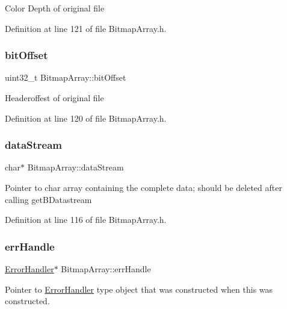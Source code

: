 Color Depth of original file 

Definition at line 121 of file Bitmap\+Array.\+h.

\mbox{\label{classBitmapArray_abcab200a1eb84331f7c79702e9199694}} 
\subsubsection{\texorpdfstring{bitOffset}{bitOffset}}
{\footnotesize\ttfamily uint32\+\_\+t Bitmap\+Array\+::bit\+Offset\hspace{0.3cm}{\ttfamily [private]}}

Headeroffest of original file 

Definition at line 120 of file Bitmap\+Array.\+h.

\mbox{\label{classBitmapArray_adce9e9343b6f351ddfaa32c234d18a0a}} 
\subsubsection{\texorpdfstring{dataStream}{dataStream}}
{\footnotesize\ttfamily char$\ast$ Bitmap\+Array\+::data\+Stream\hspace{0.3cm}{\ttfamily [private]}}

Pointer to char array containing the complete data; should be deleted after calling get\+B\+Datastream 

Definition at line 116 of file Bitmap\+Array.\+h.

\mbox{\label{classBitmapArray_a8d95e8cb2bf8c0f618465a389e8ffe4d}} 
\subsubsection{\texorpdfstring{errHandle}{errHandle}}
{\footnotesize\ttfamily \mbox{\hyperlink{classErrorHandler}{Error\+Handler}}$\ast$ Bitmap\+Array\+::err\+Handle\hspace{0.3cm}{\ttfamily [private]}}

Pointer to \mbox{\hyperlink{classErrorHandler}{Error\+Handler}} type object that was constructed when this was constructed. 

